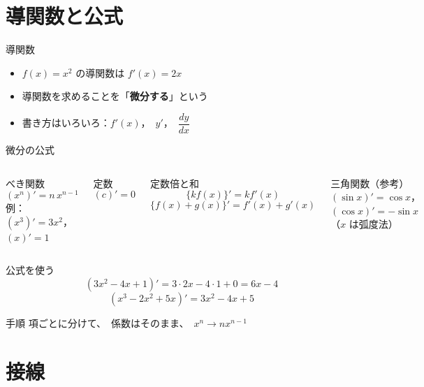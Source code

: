 \documentclass[aspectratio=169]{beamer}
\begin{document}
\section{導関数と公式}

\begin{frame}{導関数}
  \medskip
  \begin{itemize}
    \item $f(x) = x^2$ の導関数は $f'(x) = 2x$
    \item 導関数を求めることを「\textbf{微分する}」という
    \item 書き方はいろいろ：$f'(x)$，\ $y'$，\ $\dfrac{dy}{dx}$
  \end{itemize}
\end{frame}

\begin{frame}{微分の公式}
  \begin{columns}[t]
      \begin{block}{べき関数}
        \[
          (x^n)' = n\,x^{n-1}
        \]
        {\small 例：$(x^3)' = 3x^2$，\ $(x)' = 1$}
      \end{block}
      \begin{block}{定数}
        \[
          (c)' = 0
        \]
      \end{block}
      \begin{block}{定数倍と和}
        \[
          \{k f(x)\}' = k f'(x)
        \]
        \[
          \{f(x) + g(x)\}' = f'(x) + g'(x)
        \]
      \end{block}
      \begin{block}{三角関数（参考）}
        $(\sin x)' = \cos x$，\ $(\cos x)' = -\sin x$\\
        {\small （$x$ は弧度法）}
      \end{block}
  \end{columns}
\end{frame}

\begin{frame}{公式を使う}
  \[
    (3x^2 - 4x + 1)' = 3 \cdot 2x - 4 \cdot 1 + 0 = 6x - 4
  \]
  \bigskip
  \[
    (x^3 - 2x^2 + 5x)' = 3x^2 - 4x + 5
  \]
  \bigskip
  \begin{block}{手順}
    項ごとに分けて、\ 係数はそのまま、\ $x^n \to n x^{n-1}$
  \end{block}
\end{frame}

\section{接線}
\end{document}
